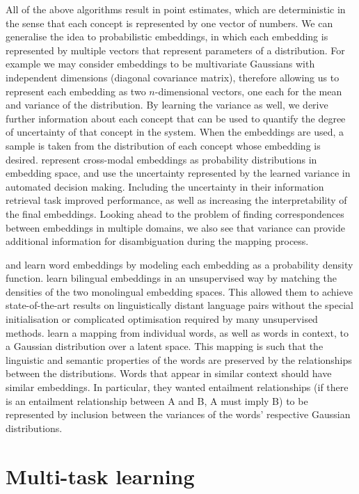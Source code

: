 All of the above algorithms result in point estimates, which are deterministic in the sense that each concept is represented by one vector of numbers. We can generalise the idea to probabilistic embeddings, in which each embedding is represented by multiple vectors that represent parameters of a distribution. For example we may consider embeddings to be multivariate Gaussians with independent dimensions (diagonal covariance matrix), therefore allowing us to represent each embedding as two $n$-dimensional vectors, one each for the mean and variance of the distribution. By learning the variance as well, we derive further information about each concept that can be used to quantify the degree of uncertainty of that concept in the system. When the embeddings are used, a sample is taken from the distribution of each concept whose embedding is desired. \cite{ProbabilisticEmbeddingsCrossModal} represent cross-modal embeddings as probability distributions in embedding space, and use the uncertainty represented by the learned variance in automated decision making. Including the uncertainty in their information retrieval task improved performance, as well as increasing the interpretability of the final embeddings. Looking ahead to the problem of finding correspondences between embeddings in multiple domains, we also see that variance can provide additional information for disambiguation during the mapping process. 

\cite{DensityMatchingWordEmbeddings} and \cite{vilnis2015word} learn word embeddings by modeling each embedding as a probability density function. \cite{DensityMatchingWordEmbeddings} learn bilingual embeddings in an unsupervised way by matching the densities of the two monolingual embedding spaces. This allowed them to achieve state-of-the-art results on linguistically distant language pairs without the special initialisation or complicated optimisation required by many unsupervised methods. \cite{vilnis2015word} learn a mapping from individual words, as well as words in context, to a Gaussian distribution over a latent space. This mapping is such that the linguistic and semantic properties of the words are preserved by the relationships between the distributions. Words that appear in similar context should have similar embeddings. In particular, they wanted entailment relationships (if there is an entailment relationship between A and B, A must imply B) to be represented by inclusion between the variances of the words' respective Gaussian distributions. 

\section{Multi-task learning}

